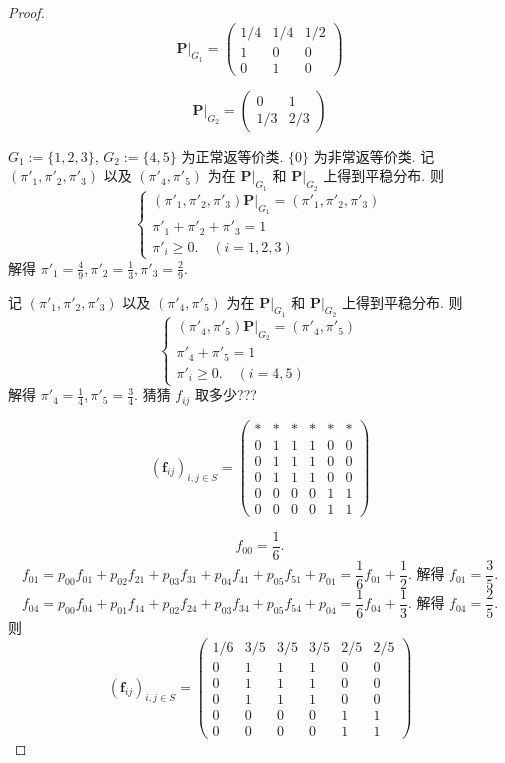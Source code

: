 \documentclass[lang=cn,10pt,thmcnt=section]{elegantbook}
\begin{document}
\begin{proof}
	\[
\mathbf{P}|_{G_1} = \begin{pmatrix}
1/4 & 1/4 & 1/2 \\
1 & 0 & 0 \\
0 & 1 & 0
\end{pmatrix}
\]

\[
\mathbf{P}|_{G_2} = \begin{pmatrix}
0 & 1 \\
1/3 & 2/3
\end{pmatrix}
\]

$G_1 := \{1, 2, 3\}$, $G_2 := \{4, 5\}$ 为正常返等价类. $\{0\}$ 为非常返等价类. 记 $(\pi'_1, \pi'_2, \pi'_3)$ 以及 $(\pi'_4, \pi'_5)$ 为在 $\mathbf{P}|_{G_1}$ 和 $\mathbf{P}|_{G_2}$ 上得到平稳分布. 则
\[
\begin{cases}
(\pi'_1, \pi'_2, \pi'_3) \mathbf{P}|_{G_1} = (\pi'_1, \pi'_2, \pi'_3) \\
\pi'_1 + \pi'_2 + \pi'_3 = 1 \\
\pi'_i \geq 0. \quad (i = 1, 2, 3)
\end{cases}
\]
解得 $\pi'_1 = \frac{4}{9}, \pi'_2 = \frac{1}{3}, \pi'_3 = \frac{2}{9}$.

记 $(\pi'_1, \pi'_2, \pi'_3)$ 以及 $(\pi'_4, \pi'_5)$ 为在 $\mathbf{P}|_{G_1}$ 和 $\mathbf{P}|_{G_2}$ 上得到平稳分布. 则
\[
\begin{cases}
(\pi'_4, \pi'_5) \mathbf{P}|_{G_2} = (\pi'_4, \pi'_5) \\
\pi'_4 + \pi'_5 = 1 \\
\pi'_i \geq 0. \quad (i = 4, 5)
\end{cases}
\]
解得 $\pi'_4 = \frac{1}{4}, \pi'_5 = \frac{3}{4}$. 猜猜 $f_{ij}$ 取多少???

\[
(\mathbf{f}_{ij})_{i,j \in S} = \begin{pmatrix}
* & * & * & * & * & * \\
0 & 1 & 1 & 1 & 0 & 0 \\
0 & 1 & 1 & 1 & 0 & 0 \\
0 & 1 & 1 & 1 & 0 & 0 \\
0 & 0 & 0 & 0 & 1 & 1 \\
0 & 0 & 0 & 0 & 1 & 1
\end{pmatrix}
\]

\[
f_{00} = \frac{1}{6}.
\]
\[
f_{01} = p_{00} f_{01} + p_{02} f_{21} + p_{03} f_{31} + p_{04} f_{41} + p_{05} f_{51} + p_{01} = \frac{1}{6} f_{01} + \frac{1}{2}. \text{ 解得 } f_{01} = \frac{3}{5}.
\]
\[
f_{04} = p_{00} f_{04} + p_{01} f_{14} + p_{02} f_{24} + p_{03} f_{34} + p_{05} f_{54} + p_{04} = \frac{1}{6} f_{04} + \frac{1}{3}. \text{ 解得 } f_{04} = \frac{2}{5}.
\]
则
\[
(\mathbf{f}_{ij})_{i,j \in S} = \begin{pmatrix}
1/6 & 3/5 & 3/5 & 3/5 & 2/5 & 2/5 \\
0 & 1 & 1 & 1 & 0 & 0 \\
0 & 1 & 1 & 1 & 0 & 0 \\
0 & 1 & 1 & 1 & 0 & 0 \\
0 & 0 & 0 & 0 & 1 & 1 \\
0 & 0 & 0 & 0 & 1 & 1
\end{pmatrix}
\]


\end{proof}
\end{document}
